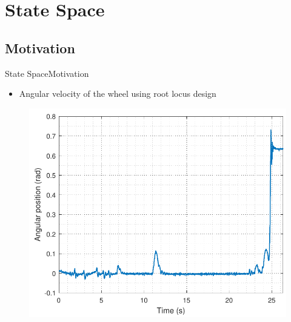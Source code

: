 \section{State Space}

\subsection{Motivation}%

\begin{frame}{State Space}{Motivation}	
  \begin{itemize}
  	\item Angular velocity of the wheel using root locus design
  \end{itemize}
  \vspace{.5cm}
  \begin{minipage}{\linewidth}
  	\begin{minipage}{0.4\linewidth}
  		\begin{figure}
  			\includegraphics[scale=.35]{Pictures/positionRLTest}
  			\centering
  		\end{figure}
  	\end{minipage}
  	\hspace{0.1\linewidth}
  	\begin{minipage}{0.45\linewidth}

\end{minipage}
\end{minipage}
\end{frame}
